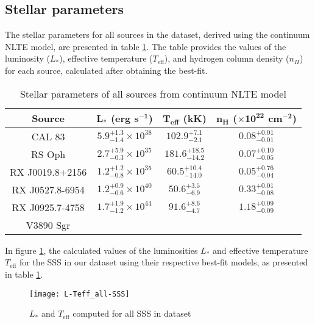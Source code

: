 		\subsection{Stellar parameters}
			The stellar parameters for all sources in the dataset, derived using the continuum NLTE model, are presented in table \ref{tab:sss-stellar-params}. The table provides the values of the luminosity ($L_*$), effective temperature ($T_\text{eff}$), and hydrogen column density ($n_H$) for each source, calculated after obtaining the best-fit.
			\renewcommand{\arraystretch}{1.8}
			\begin{table}[!htb]
				\centering
				\caption{Stellar parameters of all sources from continuum NLTE model}
				\label{tab:sss-stellar-params}
				\begin{tabular}{cccc}
				\hline
				{\textbf{Source}} & {$\boldsymbol{L_*}$ \textbf{(erg s$\boldsymbol{^{-1}}$)}} & {\textbf{$\boldsymbol{T_\text{eff}}$ (kK)}} & {\textbf{$\boldsymbol{n_H}$ ($\boldsymbol{\times 10^{22}}$ cm$\boldsymbol{^{-2}}$)}} \\
				\hline
				{CAL 83} & {$5.9_{-1.4}^{+1.3}\times 10^{38}$} & {$102.9_{-2.1}^{+7.1}$} & {$0.08_{-0.01}^{+0.01}$} \\
				{RS Oph} & {$2.7_{-0.3}^{+5.9}\times 10^{35}$} & {$181.6_{-14.2}^{+18.5}$} & {$0.07_{-0.05}^{+0.10}$} \\
				{RX J0019.8+2156} & {$1.2_{-0.8}^{+1.2}\times 10^{35}$} & {$60.5_{-14.0}^{+10.4}$} & {$0.05_{-0.04}^{+0.76}$} \\
				{RX J0527.8-6954} & {$1.2_{-0.6}^{+0.9}\times 10^{40}$} & {$50.6_{-6.9}^{+3.5}$} & {$0.33_{-0.08}^{+0.01}$} \\
				{RX J0925.7-4758} & {$1.7_{-1.2}^{+1.9}\times 10^{44}$} & {$91.6_{-4.7}^{+8.6}$} & {$1.18_{-0.09}^{+0.09}$} \\
				{V3890 Sgr} & {} & {} & {} \\
				\hline
				\end{tabular}
			\end{table}
			\renewcommand{\arraystretch}{2.2}
			
			In figure \ref{result:L-Teff-SSS}, the calculated values of the luminosities $L_*$ and effective temperature $T_\text{eff}$ for the SSS in our dataset using their respective best-fit models, as presented in table \ref{tab:sss-stellar-params}.
			\begin{figure}[h!]
				\centering
				\texttt{[image: L-Teff\_all-SSS]}
				\caption{$L_*$ and $T_\text{eff}$ computed for all SSS in dataset}
				\label{result:L-Teff-SSS}
			\end{figure}
		
